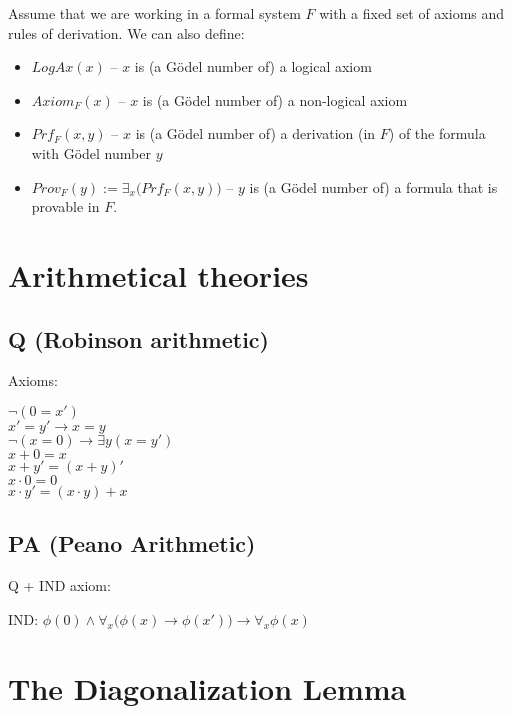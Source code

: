 \documentclass{article}
\begin{document}
Assume that we are working in a formal system $F$ with a fixed set of axioms and rules of derivation.
We can also define:

\begin{itemize}
    \item $LogAx(x)$ -- $x$ is (a Gödel number of) a logical axiom
    \item $Axiom_F(x)$ -- $x$ is (a Gödel number of) a non-logical axiom
    \item $Prf_F(x, y)$ -- $x$ is (a Gödel number of) a derivation (in $F$) of the formula with
        Gödel number $y$
    \item $Prov_F(y) := \exists_x \bigl( Prf_F(x, y) \bigl)$ -- $y$ is (a Gödel number of) a formula
        that is provable in $F$.
\end{itemize}

\section{Arithmetical theories}

\subsection{Q (Robinson arithmetic)}

Axioms:
\begin{center}
    $\neg (0 = x')$ \\
    $x' = y' \rightarrow x = y$ \\
    $\neg (x = 0) \rightarrow \exists y (x = y')$ \\
    $x + 0 = x$ \\
    $x + y' = (x + y)'$ \\
    $x \cdot 0 = 0$ \\
    $x \cdot y' = (x \cdot y) + x$
\end{center}

\subsection{PA (Peano Arithmetic)}

Q + IND axiom:

\begin{center}
    IND: $\phi(0) \land \forall_x \bigl( \phi(x) \rightarrow \phi(x') \bigl) \rightarrow \forall_x \phi(x)$
\end{center}

\section{The Diagonalization Lemma}
\end{document}
